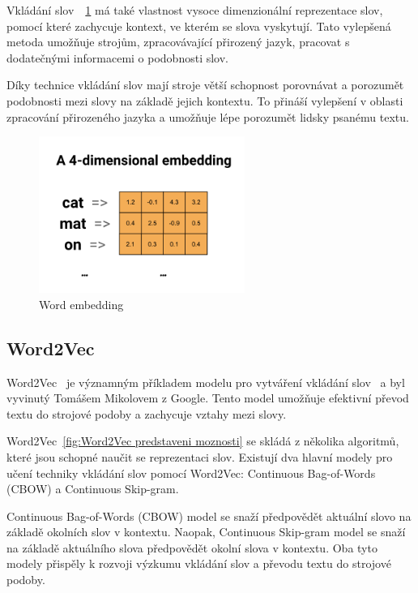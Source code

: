 Vkládání slov~\cite{link5}~\ref{fig:Word embedding} má také vlastnost vysoce dimenzionální reprezentace slov, pomocí které zachycuje kontext, ve kterém se slova vyskytují.
Tato vylepšená metoda umožňuje strojům, zpracovávající přirozený jazyk, pracovat s dodatečnými informacemi o podobnosti slov.

Díky technice vkládání slov mají stroje větší schopnost porovnávat a porozumět podobnosti mezi slovy na základě jejich kontextu. To přináší vylepšení v oblasti zpracování přirozeného jazyka a umožňuje lépe porozumět lidsky psanému textu.

\begin{figure}[H]
	\centering
	\includegraphics[width=0.6\textwidth]{Figures/embedding2.png}
	\caption{Word embedding~\cite{link5}}\label{fig:Word embedding}
\end{figure}

\subsection{Word2Vec}
Word2Vec~\cite{link6} je významným příkladem modelu pro vytváření vkládání slov~\cite{link5} a byl vyvinutý Tomášem Mikolovem z Google. Tento model umožňuje efektivní převod textu do strojové podoby a zachycuje vztahy mezi slovy.

Word2Vec~\ref{fig:Word2Vec predstaveni moznosti} se skládá z několika algoritmů, které jsou schopné naučit se reprezentaci slov. Existují dva hlavní modely pro učení techniky vkládání slov pomocí Word2Vec: Continuous Bag-of-Words (CBOW) a Continuous Skip-gram.

Continuous Bag-of-Words (CBOW) model se snaží předpovědět aktuální slovo na základě okolních slov v kontextu. Naopak, Continuous Skip-gram model se snaží na základě aktuálního slova předpovědět okolní slova v kontextu. Oba tyto modely přispěly k rozvoji výzkumu vkládání slov a převodu textu do strojové podoby.

